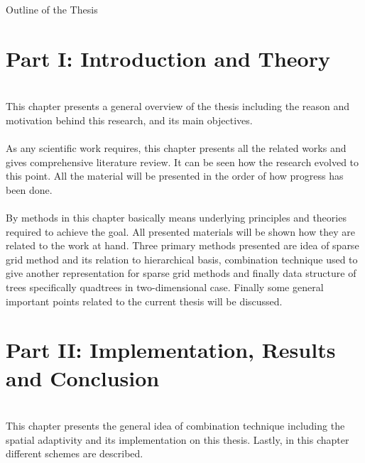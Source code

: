\clearemptydoublepage

{}

\begin{center}
	\huge{Outline of the Thesis}
\end{center}




\section*{Part I: Introduction and Theory}

\\
\noindent  This chapter presents a general overview of the thesis including the reason and motivation behind this research, and its main objectives. \\

 \\
\noindent  As any scientific work requires, this chapter presents all the related works and gives comprehensive literature review. It can be seen how the research evolved to this point. All the material will be presented in the order of how progress has been done. \\

\\
\noindent  By methods in this chapter basically means underlying principles and theories required to achieve the goal. All presented materials will be shown how they are related to the work at hand. Three primary methods presented are idea of sparse grid method and its relation to hierarchical basis, combination technique used to give another representation for sparse grid methods and finally data structure of trees specifically quadtrees in two-dimensional case. Finally some general important points related to the current thesis will be discussed.\\



\section*{Part II: Implementation, Results and Conclusion}

\\
\noindent  This chapter presents the general idea of combination technique including the spatial adaptivity and its implementation on this thesis. Lastly, in this chapter different schemes are described.  \\


